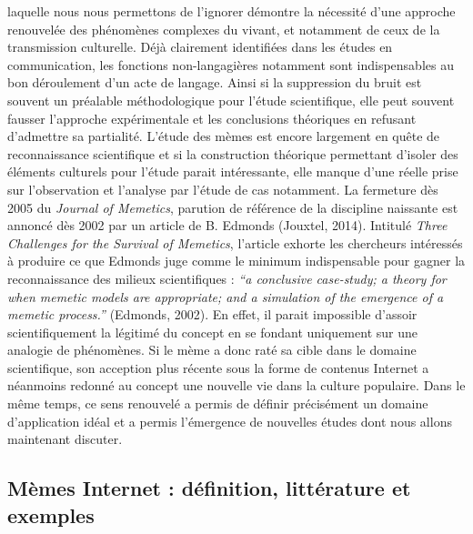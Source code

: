 laquelle nous nous permettons de l{\textquoteright}ignorer d\'emontre la n\'ecessit\'e d{\textquoteright}une approche renouvel\'ee des ph\'enom\`enes complexes du vivant, et notamment de ceux de la transmission culturelle. D\'ej\`a clairement identifi\'ees dans les \'etudes en communication, les fonctions non-langagi\`eres notamment sont indispensables au bon d\'eroulement d{\textquoteright}un acte de langage. Ainsi si la suppression du bruit est souvent un pr\'ealable m\'ethodologique pour l{\textquoteright}\'etude scientifique, elle peut souvent fausser l{\textquoteright}approche exp\'erimentale et les conclusions th\'eoriques en refusant d{\textquoteright}admettre sa partialit\'e. L{\textquoteright}\'etude des m\`emes est encore largement en qu\^ete de reconnaissance scientifique et si la construction th\'eorique permettant d{\textquoteright}isoler des \'el\'ements culturels pour l{\textquoteright}\'etude parait int\'eressante, elle manque d{\textquoteright}une r\'eelle prise sur l{\textquoteright}observation et l{\textquoteright}analyse par l{\textquoteright}\'etude de cas notamment. La fermeture d\`es 2005 du \textit{Journal of Memetics}, parution de r\'ef\'erence de la discipline naissante est annonc\'e d\`es 2002 par un article de B. Edmonds (Jouxtel, 2014). Intitul\'e \textit{Three Challenges for the Survival of Memetics}, l{\textquoteright}article\textit{ }exhorte les chercheurs int\'eress\'es \`a produire ce que Edmonds juge comme le minimum indispensable pour gagner la reconnaissance des milieux scientifiques : \textit{{\textquotedblleft}a conclusive case-study; a theory for when memetic models are appropriate; and a simulation of the emergence of a memetic process.{\textquotedblright}} (Edmonds, 2002).  
En effet, il parait impossible d{\textquoteright}assoir scientifiquement la l\'egitim\'e du concept en se fondant uniquement sur une analogie de ph\'enom\`enes. Si le m\`eme a donc rat\'e sa cible dans le domaine scientifique, son acception plus r\'ecente sous la forme de contenus Internet a n\'eanmoins redonn\'e au concept une nouvelle vie dans la culture populaire. Dans le m\^eme temps, ce sens renouvel\'e a permis de d\'efinir pr\'ecis\'ement un domaine d{\textquoteright}application id\'eal et a permis l{\textquoteright}\'emergence de nouvelles \'etudes dont nous allons maintenant discuter. 

\subsection[ M\`emes Internet : d\'efinition, litt\'erature et exemples]{M\`emes Internet : d\'efinition, litt\'erature et exemples}

